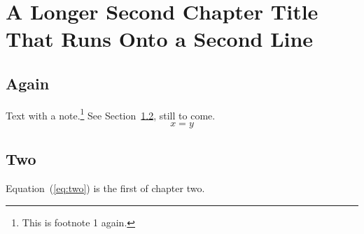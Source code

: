 \documentclass[11pt]{report}
\begin{document}
\chapter[Short title]{A Longer Second Chapter Title That Runs Onto a Second Line}
\section{Again}
Text with a note.\footnote{This is footnote 1 again.} See Section~\ref{sec:two}, still to come.
\begin{equation}x = y\label{eq:two}\end{equation}
\section{Two}\label{sec:two}
Equation~(\ref{eq:two}) is the first of chapter two.
\end{document}

